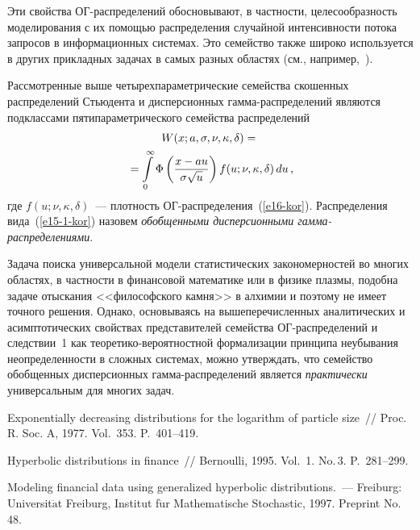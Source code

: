 \begin{multicols}{2}
Эти свойства ОГ-рас\-пре\-де\-ле\-ний обосновывают, в част\-ности,
целесообразность моделирования с их помощью распределения
случайной интен\-сив\-ности потока запросов в информационных сис\-те\-мах.
Это семейство также широко используется в других прикладных
задачах в самых разных областях (см., например,~\cite{KorolevShorgin2011}).

Рассмотренные выше четырехпараметрические семейства скошенных
распределений Стьюдента и дисперсионных гамма-распределений
являются подклассами пятипараметрического семейства распределений
\begin{multline}
W(x;a,\sigma,\nu,\kappa,\delta)={}\\
{}=
\int\limits_{0}^{\infty}\Phi\left(\displaystyle\frac{\displaystyle x-au\mathstrut}{\displaystyle \sigma\sqrt{u}\mathstrut}\right)
f(u;\nu,\kappa,\delta)\,du\,,\label{e15-1-kor}
\end{multline}
где $f(u;\nu,\kappa,\delta)$~--- плотность ОГ-рас\-пре\-де\-ле\-ния~(\ref{e16-kor}).
Распределения вида~(\ref{e15-1-kor}) назовем \textit{обобщенными дисперсионными
гам\-ма-рас\-пре\-де\-ле\-ни\-ями}.

Задача поиска универсальной модели статистических закономерностей
во многих областях, в частности в финансовой математике или в
физике плазмы, подобна задаче отыскания <<философского камня>> в
алхимии и поэтому не имеет точного решения. Однако, основываясь на
вышепере\-чис\-ленных аналитических и асимптотических свойствах
представителей семейства ОГ-рас\-пре\-де\-ле\-ний и следствии~1 как
тео\-ре\-ти\-ко-ве\-ро\-ят\-но\-ст\-ной формализации принципа неубывания
не\-опре\-де\-лен\-ности в сложных сис\-те\-мах, можно утверждать, что
семейство обобщенных дисперсионных гам\-ма-рас\-пре\-де\-ле\-ний является
\textit{практически} универсальным для многих задач.

{\small\frenchspacing
{%
\begin{thebibliography}{99}


Exponentially decreasing distributions for
the logarithm of particle size~// Proc. R. Soc. A, 1977. Vol.~353.
P.~401--419.

Hyperbolic distributions in finance~// Bernoulli, 1995. Vol.~1. No.\,3.
P.~281--299.

 Modeling financial data using generalized hyperbolic
distri\-butions.~--- Freiburg: Universit$\ddot{\mbox{a}}$t Freiburg, Institut
f$\ddot{\mbox{u}}$r Mathematische Stochastic, 1997. Preprint No.\,48.


\end{thebibliography}}}
\end{multicols}
